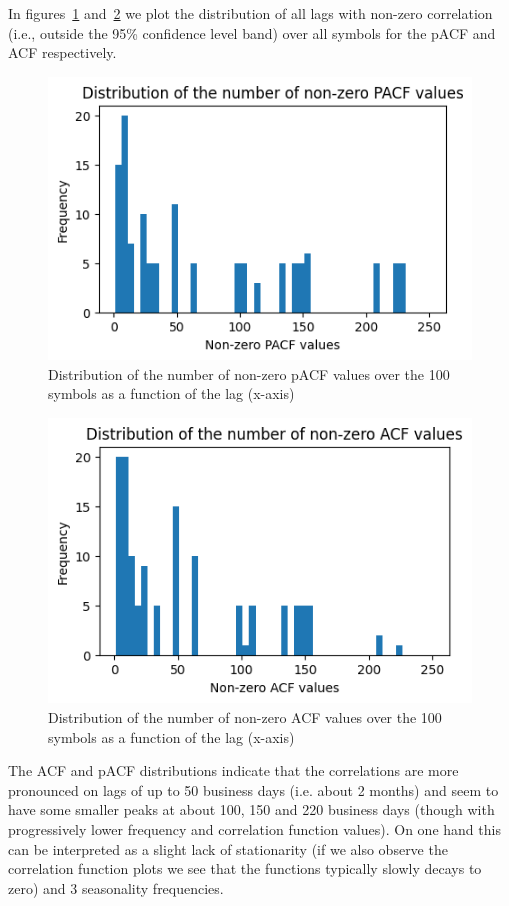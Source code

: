 \documentclass[10pt]{article}
\begin{document}
In figures~{\ref{695023}}
and~{\ref{769583}} we plot the distribution of all lags
with non-zero correlation (i.e., outside the 95\% confidence level band)
over all symbols for the pACF and ACF respectively.
\begin{figure}[H]
\begin{center}
\includegraphics[width=0.70\columnwidth]{figures/output7/output7}
\caption{{Distribution of the number of non-zero pACF values over the 100 symbols
as a function of the lag (x-axis)
{\label{695023}}%
}}
\end{center}
\end{figure}
\begin{figure}[H]
\begin{center}
\includegraphics[width=0.70\columnwidth]{figures/output8/output8}
\caption{{Distribution of the number of non-zero ACF values over the 100 symbols
as a function of the lag (x-axis)
{\label{769583}}%
}}
\end{center}
\end{figure}

The ACF and pACF distributions indicate that the correlations are more
pronounced on lags of up to 50 business days (i.e. about 2 months) and
seem to have some smaller peaks at about 100, 150 and 220 business days
(though with progressively lower frequency and correlation function
values). On one hand this can be interpreted as a slight lack of
stationarity (if we also observe the correlation function plots we see
that the functions typically slowly decays to zero) and 3 seasonality
frequencies.
\end{document}
